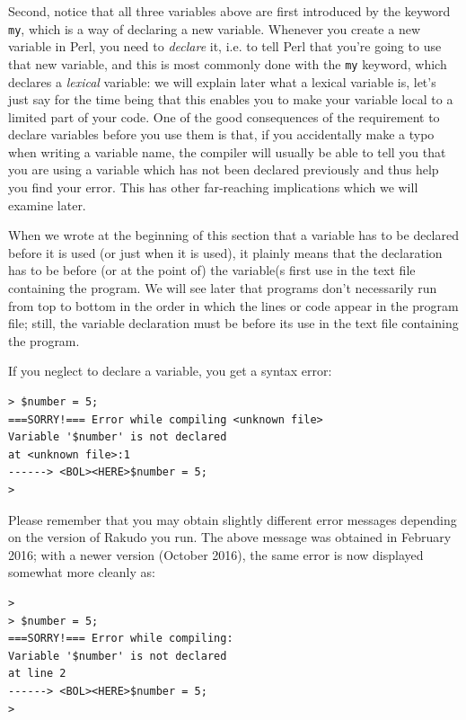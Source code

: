 Second, notice that all three variables above are first introduced by the keyword {\tt my}, which is a way of declaring a new variable. Whenever you create a new variable in Perl, you need to \emph{declare} it, i.e. to tell Perl that you're going to use that new variable, and this is most commonly done  with the {\tt my} keyword, which declares a \emph{lexical} variable: we will explain later what a lexical variable is, let's just say for the time being that this enables you to make your variable local to a limited part of your code. One of the good consequences of the requirement to declare variables before you use them is that, if you accidentally make a typo when writing a variable name, the compiler will usually be able to tell you that you are using a variable which has not been declared previously and thus help you find your error. This has other far-reaching implications which we will examine later.

When we wrote at the beginning of this section that a variable has 
to be declared before it is used (or just when it is used), it plainly 
means that the declaration has to be before (or at the point of) the 
variable(s first use in the text file containing the program. We will see later that 
programs don't necessarily run from top to bottom in the order in which 
the lines or code appear in the program file; still, the variable 
declaration must be before its use in the text file containing the program.

If you neglect to declare a variable, you get a syntax error:

\begin{verbatim}
> $number = 5;
===SORRY!=== Error while compiling <unknown file>
Variable '$number' is not declared
at <unknown file>:1
------> <BOL><HERE>$number = 5;
>
\end{verbatim}
%
Please remember that you may obtain slightly different 
error messages depending on the version of Rakudo you 
run. The above message was obtained in February 2016; 
with a newer version (October 2016), the same error 
is now displayed somewhat more cleanly as:
\begin{verbatim}
>
> $number = 5;
===SORRY!=== Error while compiling:
Variable '$number' is not declared
at line 2
------> <BOL><HERE>$number = 5;
>
\end{verbatim}


